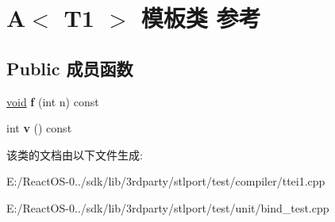 \hypertarget{struct_a}{}\section{A$<$ T1 $>$ 模板类 参考}
\label{struct_a}
\subsection*{Public 成员函数}
\begin{DoxyCompactItemize}
\item 
\mbox{\label{struct_a_a50dc8b0a68e4462131936453f519fdf1}} 
\hyperlink{interfacevoid}{void} {\bfseries f} (int n) const
\item 
\mbox{\label{struct_a_af2606805097b5f193035d93386236ec5}} 
int {\bfseries v} () const
\end{DoxyCompactItemize}


该类的文档由以下文件生成\+:\begin{DoxyCompactItemize}
\item 
E\+:/\+React\+O\+S-\/0../sdk/lib/3rdparty/stlport/test/compiler/ttei1.\+cpp\item 
E\+:/\+React\+O\+S-\/0../sdk/lib/3rdparty/stlport/test/unit/bind\+\_\+test.\+cpp\end{DoxyCompactItemize}
